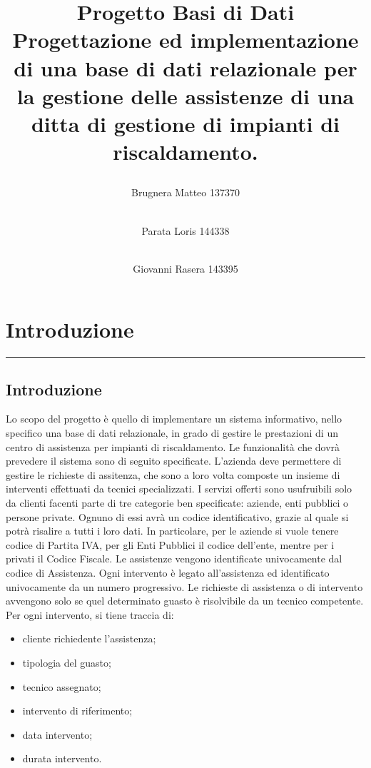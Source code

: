 \documentclass[a4paper]{article}
\begin{document}
\title{%
\raggedright Progetto Basi di Dati \\ \large \bigskip Progettazione ed implementazione di una base di dati relazionale per la gestione delle assistenze di una ditta di gestione di impianti di riscaldamento.}
\maketitle

\begin{flushleft}
\author{Brugnera Matteo 137370 \and \\ Parata Loris 144338 \and \\ Giovanni Rasera 143395}

\end{flushleft}

\newpage
\tableofcontents

\newpage
\section{Introduzione}
\rule{\linewidth}{1.5pt}
\subsection{Introduzione}
Lo scopo del progetto è quello di implementare un sistema informativo, nello specifico una base di dati relazionale, in grado di gestire le prestazioni di un centro di assistenza per impianti di riscaldamento. 
Le funzionalità che dovrà prevedere il sistema sono di seguito specificate.
L'azienda deve permettere di gestire le richieste di assitenza, che sono a loro volta composte un insieme di interventi effettuati da tecnici specializzati.
I servizi offerti sono usufruibili solo da clienti facenti parte di tre categorie ben specificate: aziende, enti pubblici o persone private.
Ognuno di essi avrà un codice identificativo, grazie al quale si potrà risalire a tutti i loro dati. 
In particolare, per le aziende si vuole tenere codice di Partita IVA, per gli Enti Pubblici il codice dell'ente, mentre per i privati il Codice Fiscale.
Le assistenze vengono identificate univocamente dal codice di Assistenza. Ogni intervento è legato all'assistenza ed identificato univocamente da un numero progressivo. 
Le richieste di assistenza o di intervento avvengono solo se quel determinato guasto è risolvibile da un tecnico competente.\\
Per ogni intervento, si tiene traccia di:
\medskip
\begin{itemize}
    \item cliente richiedente l'assistenza;
    \item tipologia del guasto;
    \item tecnico assegnato;
    \item intervento di riferimento;
    \item data intervento;
    \item durata intervento.
\end{itemize}
\end{document}
